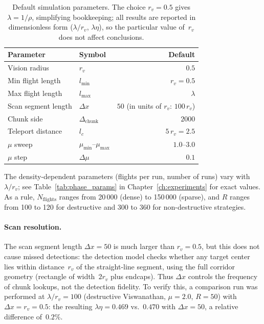 \begin{table}[htb]
\centering
\begin{tabular}{llr}
\toprule
Parameter & Symbol & Default \\
\midrule
Vision radius         & $r_v$           & $0.5$ \\
Min flight length     & $l_{\min}$      & $r_v = 0.5$ \\
Max flight length     & $l_{\max}$      & $\lambda$ \\
Scan segment length   & $\Delta x$      & $50$ (in units of $r_v$: $100\,r_v$) \\
Chunk side            & $\Delta_{\mathrm{chunk}}$ & $2000$ \\
Teleport distance     & $l_c$           & $5\,r_v = 2.5$ \\
$\mu$ sweep           & $\mu_{\min}$--$\mu_{\max}$ & $1.0$--$3.0$ \\
$\mu$ step            & $\Delta\mu$     & $0.1$ \\
\bottomrule
\end{tabular}
\caption{Default simulation parameters.  The choice $r_v = 0.5$
         gives $\lambda = 1/\rho$, simplifying bookkeeping; all
         results are reported in dimensionless form
         ($\lambda/r_v$, $\lambda\eta$), so the particular value
         of~$r_v$ does not affect conclusions.}
\label{tab:defaults}
\end{table}

The density-dependent parameters (flights per run, number of runs)
vary with $\lambda/r_v$; see Table~\ref{tab:phase_params}
in Chapter~\ref{ch:experiments} for exact values.  As a rule,
$N_{\mathrm{flights}}$ ranges from 20\,000 (dense) to 150\,000
(sparse), and $R$ ranges from 100 to 120 for destructive and
300 to 360 for non-destructive strategies.

\paragraph{Scan resolution.}
The scan segment length $\Delta x = 50$ is much larger than
$r_v = 0.5$, but this does not cause missed detections: the
detection model checks whether any target center lies within
distance~$r_v$ of the straight-line segment, using the full
corridor geometry (rectangle of width~$2r_v$ plus endcaps).
Thus $\Delta x$ controls the frequency of chunk lookups, not
the detection fidelity.  To verify this, a comparison run was
performed at $\lambda/r_v = 100$ (destructive Viswanathan,
$\mu = 2.0$, $R = 50$) with $\Delta x = r_v = 0.5$: the
resulting $\lambda\eta = 0.469$ vs.\ $0.470$ with
$\Delta x = 50$, a relative difference of~$0.2\%$.

